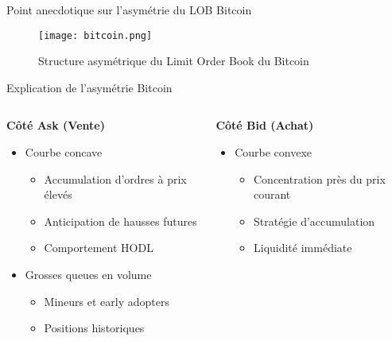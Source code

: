\documentclass[aspectratio=169]{beamer}  %
\begin{document}
\begin{frame}{Point anecdotique sur l'asymétrie du LOB Bitcoin}
    \begin{figure}
        \centering
        \texttt{[image: bitcoin.png]}
        \caption{Structure asymétrique du Limit Order Book du Bitcoin}
    \end{figure}
\end{frame}

\begin{frame}{Explication de l'asymétrie Bitcoin}
    \begin{columns}
        \begin{column}{0.5\textwidth}
            \textbf{Côté Ask (Vente)}
            \begin{itemize}
                \item \small{Courbe concave}
                \begin{itemize}
                    \item \footnotesize{Accumulation d'ordres à prix élevés}
                    \item \footnotesize{Anticipation de hausses futures}
                    \item \footnotesize{Comportement HODL}
                \end{itemize}
                \item \small{Grosses queues en volume}
                \begin{itemize}
                    \item \footnotesize{Mineurs et early adopters}
                    \item \footnotesize{Positions historiques}
                \end{itemize}
            \end{itemize}
        \end{column}
        \begin{column}{0.5\textwidth}
            \textbf{Côté Bid (Achat)}
            \begin{itemize}
                \item \small{Courbe convexe}
                \begin{itemize}
                    \item \footnotesize{Concentration près du prix courant}
                    \item \footnotesize{Stratégie d'accumulation}
                    \item \footnotesize{Liquidité immédiate}
                \end{itemize}

\end{itemize}
\end{column}
\end{columns}
\end{frame}
\end{document}
